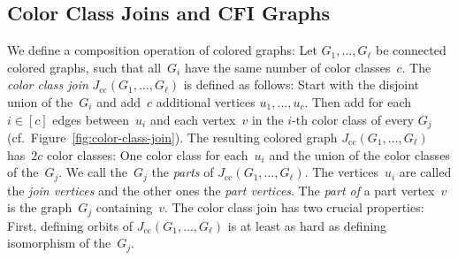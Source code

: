 \documentclass[]{lmcs}
\newcommand{\defining}[1]{\emph{#1}}
\newcommand{\vertA}{u}
\newcommand{\vertB}{v}
\begin{document}
\newcommand{\ccjoin}[1]{J_{\text{cc}}(#1)}
\newcommand{\ccjoink}[2]{J_{\text{cc}}^{#1}(#2)}
\subsection{Color Class Joins and CFI Graphs}
\label{sec:color-class-joins-and-cfi}
We define a composition operation of colored graphs:
Let $G_1, \dots , G_\ell$ be connected colored graphs,
such that all~$G_i$ have the same number of color classes~$c$.
The \defining{color class join} $\ccjoin{G_1, \dots, G_\ell}$ is defined as follows:
Start with the disjoint union of the~$G_i$ and add~$c$ additional vertices $\vertA_1, \dots, \vertA_c$.
Then add for each $i \in[c]$ edges between~$\vertA_i$ and each vertex~$\vertB$ in the $i$-th color class of every $G_j$ (cf.~Figure~\ref{fig:color-class-join}).
The resulting colored graph $\ccjoin{G_1, \dots, G_\ell}$ has~$2c$ color classes:
One color class for each~$\vertA_i$ and the union of the color classes of the~$G_j$.
We call the~$G_j$ the \defining{parts} of $\ccjoin{G_1, \dots, G_\ell}$.
The vertices~$\vertA_i$ are called the \defining{join vertices} and the other ones the \defining{part vertices}.
The \defining{part of} a part vertex~$\vertB$ is the graph~$G_j$ containing~$\vertB$.
The color class join has two crucial properties:
First, defining orbits of  $\ccjoin{G_1, \dots, G_\ell}$
is at least as hard as defining isomorphism of the~$G_j$.
\end{document}

